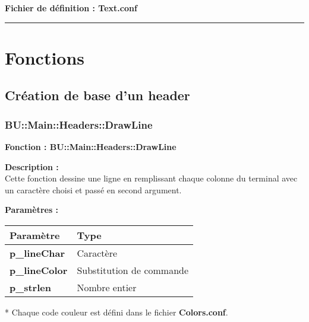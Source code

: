 \documentclass[a4paper,10pt]{article}
\begin{document}
\textbf{Fichier de définition : \color{lime}Text.conf}\\[1\baselineskip]





\color{red}\par\noindent\rule{\textwidth}{0.4pt}\color{white}

\color{red}
\section{Fonctions}\color{white}

\color{green}
\subsection{Création de base d'un header}\color{white}

\color{blue}
\subsubsection{BU::Main::Headers::DrawLine}\color{white}

\textbf{Fonction : \color{mauve}BU::Main::Headers::DrawLine}\\[1\baselineskip]

\begin{justify}
    \textbf{Description :}\\
    Cette fonction dessine une ligne en remplissant chaque colonne du terminal avec un caractère choisi et passé en second argument.
\end{justify}

\textbf{Paramètres :}\\[1\baselineskip]
\begin{tabular}{|l|l|}
\hline
\textbf{Paramètre} & \textbf{Type} \\
\hline
\textbf{\color{orange}p\_lineChar} & Caractère\\
\hline
\textbf{\color{orange}p\_lineColor} & Substitution de commande\\
\hline
\textbf{\color{orange}p\_strlen} & Nombre entier\\
\hline
\end{tabular}


\begin{justify}
    * Chaque code couleur est défini dans le fichier \textbf{\color{lime}Colors.conf}.
\end{justify}
\end{document}
